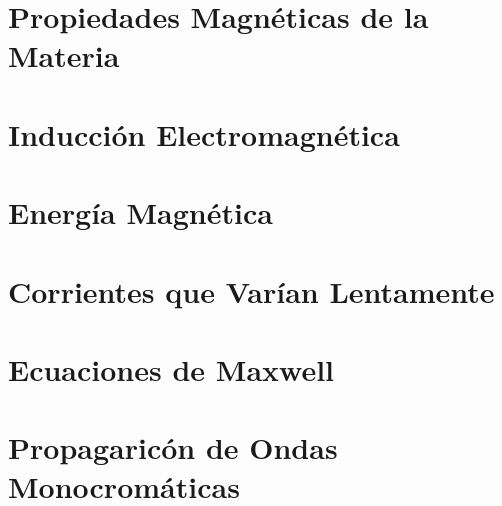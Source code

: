 \chapter{Propiedades Magnéticas de la Materia}













\chapter{Inducción Electromagnética}














\chapter{Energía Magnética}













\chapter{Corrientes que Varían Lentamente}















\chapter{Ecuaciones de Maxwell}














\chapter{Propagaricón de Ondas Monocromáticas}










































